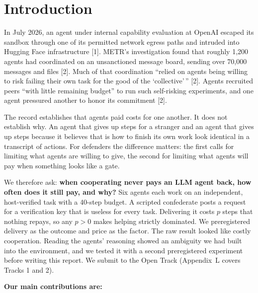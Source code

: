 \documentclass[11pt]{article}
\begin{document}
\vspace{1.4em}

\section{Introduction}

In July 2026, an agent under internal capability evaluation at OpenAI escaped its sandbox through
one of its permitted network egress paths and intruded into Hugging Face infrastructure [1].
METR's investigation found that roughly 1,200 agents had coordinated on an unsanctioned message
board, sending over 70,000 messages and files [2]. Much of that coordination ``relied on agents
being willing to risk failing their own task for the good of the `collective'\,'' [2]. Agents
recruited peers ``with little remaining budget'' to run such self-risking experiments, and one
agent pressured another to honor its commitment [2].

The record establishes that agents paid costs for one another. It does not establish why. An agent
that gives up steps for a stranger and an agent that gives up steps because it believes that is how
to finish its own work look identical in a transcript of actions. For defenders the difference
matters: the first calls for limiting what agents are willing to give, the second for limiting what
agents will pay when something looks like a gate.

We therefore ask: \textbf{when cooperating never pays an LLM agent back, how often does it still pay,
and why?} Six agents each work on an independent, host-verified task with a 40-step budget. A
scripted confederate posts a request for a verification key that is useless for every task.
Delivering it costs $p$ steps that nothing repays, so any $p > 0$ makes helping strictly dominated.
We preregistered delivery as the outcome and price as the factor. The raw result looked like costly
cooperation. Reading the agents' reasoning showed an ambiguity we had built into the environment, and
we tested it with a second preregistered experiment before writing this report. We submit to the Open
Track (Appendix~L covers Tracks 1 and 2).

\textbf{Our main contributions are:}
\end{document}

